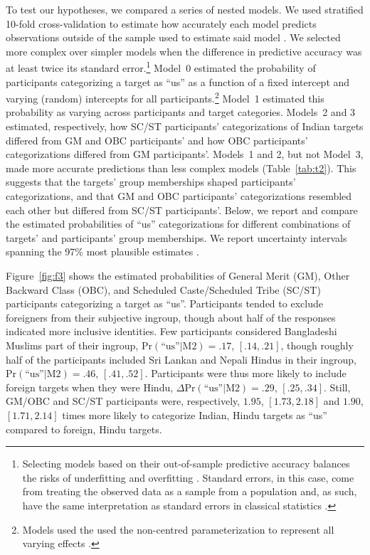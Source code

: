 \documentclass[12pt, a4paper]{article}
\newcommand{\pest}[4]{$ \text{Pr} (\text{``us''} | \text{#1}) = #2$, $[#3, #4]$}
\newcommand{\pdif}[4]{$ \Delta\text{Pr} (\text{``us''} | \text{#1}) = #2$, $[#3, #4]$}
\begin{document}
To test our hypotheses, we compared a series of nested models. We used stratified 10-fold cross-validation to estimate how accurately each model predicts observations outside of the sample used to estimate said model \cite{vehtari_practical_2017}. We selected more complex over simpler models when the difference in predictive accuracy was at least twice its standard error.\footnote{Selecting models based on their out-of-sample predictive accuracy balances the risks of underfitting and overfitting \cite<see also>{yarkoni_choosing_2017}. Standard errors, in this case, come from treating the observed data as a sample from a population and, as such, have the same interpretation as standard errors in classical statistics \cite{vehtari_practical_2017}.} Model~0 estimated the probability of participants categorizing a target as ``us'' as a function of a fixed intercept and varying (random) intercepts for all participants.\footnote{Models used the used the non-centred parameterization to represent all varying effects \cite{betancourt_hamilton_2015}.} Model~1 estimated this probability as varying across participants and target categories. Models~2 and 3 estimated, respectively, how SC/ST participants' categorizations of Indian targets differed from GM and OBC participants' and how OBC participants' categorizations differed from GM participants'. Models~1 and 2, but not Model~3, made more accurate predictions than less complex models (Table~\ref{tab:t2}). This suggests that the targets' group memberships shaped participants' categorizations, and that GM and OBC participants' categorizations resembled each other but differed from SC/ST participants'. Below, we report and compare the estimated probabilities of ``us'' categorizations for different combinations of targets' and participants' group memberships. We report uncertainty intervals spanning the 97\% most plausible estimates \cite{coda_package}.

Figure~\ref{fig:f3} shows the estimated probabilities of General Merit (GM), Other Backward Class (OBC), and Scheduled Caste/Scheduled Tribe (SC/ST) participants categorizing a target as ``us''. Participants tended to exclude foreigners from their subjective ingroup, though about half of the responses indicated more inclusive identities. Few participants considered Bangladeshi Muslims part of their ingroup, \pest{M2}{.17}{.14}{.21}, though roughly half of the participants included Sri Lankan and Nepali Hindus in their ingroup, \pest{M2}{.46}{.41}{.52}. Participants were thus more likely to include foreign targets when they were Hindu, \pdif{M2}{.29}{.25}{.34}. Still, GM/OBC and SC/ST participants were, respectively, $1.95$, $[1.73, 2.18]$ and $1.90$, $[1.71, 2.14]$ times more likely to categorize Indian, Hindu targets as ``us'' compared to foreign, Hindu targets.
\end{document}
